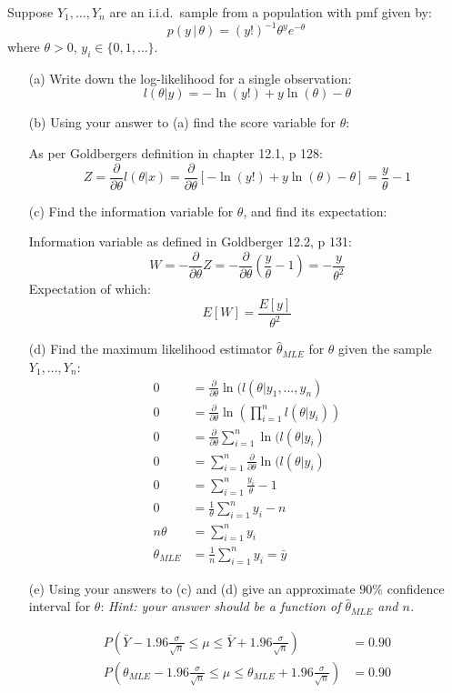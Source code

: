 \documentclass{article}
\newcommand{\1}{\mathbf{1}}
\begin{document}
Suppose $Y_1,\ldots, Y_n$ are an i.i.d.~sample from a population with pmf given by:
\begin{equation}
    p(y\, |\, \theta) = (y!)^{-1} \theta^y e^{-\theta} 
\end{equation}
where {$\theta > 0$}, $y_i \in \{0,1,\ldots \}$.
\begin{itemize}
    \item[(a)] Write down the log-likelihood for a single observation:
    $$l(\theta|y) = -\ln(y!) + y\ln(\theta) - \theta$$

    \item[(b)] Using your answer to (a) find the score variable for $\theta$:
    
    As per Goldbergers definition in chapter 12.1, p 128:
    $$ Z = \frac{\partial}{\partial\theta} l(\theta|x) = \frac{\partial}{\partial\theta}\left[  -\ln(y!) + y\ln(\theta) - \theta  \right] = \frac{y}{\theta} -1$$

    \item[(c)] Find the information variable for $\theta$, and find its expectation:
    
    Information variable as defined in Goldberger 12.2, p 131:
    $$W = -\frac{\partial}{\partial\theta} Z = -\frac{\partial}{\partial\theta } \left(\frac{y}{\theta} -1\right) = - \frac{y}{\theta^2}$$
    Expectation of which:
    $$E[W] = \frac{E[y]}{\theta^2}$$

    \item[(d)]  Find the maximum likelihood estimator $\hat{\theta}_{MLE}$ for $\theta$ given the sample $Y_1,\ldots, Y_n$:
    \begin{align*}
        0 &= \frac{\partial}{\partial\theta} \ln(l(\theta|y_1,\hdots ,y_n) \\
        0 &= \frac{\partial}{\partial\theta} \ln\left( \prod_{i=1}^n l(\theta|y_i) \right) \\
        0 &= \frac{\partial}{\partial\theta} \sum_{i=1}^n \ln(l(\theta|y_i) \\
        0 &= \sum_{i=1}^n \frac{\partial}{\partial\theta} \ln(l(\theta|y_i) \\
        0 &= \sum_{i=1}^n \frac{y_i}{\theta} -1 \\
        0 &= \frac{1}{\theta} \sum_{i=1}^n y_i - n \\
        n\theta  &= \sum_{i=1}^n y_i \\
        \theta_{MLE} &= \frac{1}{n} \sum_{i=1}^n y_i = \bar y 
    \end{align*}

    \item[(e)]  Using your answers to (c) and (d) give an approximate $90\%$ confidence interval for $\theta$: {\it Hint: your answer should be a function of $\hat{\theta}_{MLE}$ and $n$.}
    
    \begin{align*}
        P\left(\bar Y - 1.96\frac{\sigma}{\sqrt n} \leq \mu \leq \bar Y + 1.96\frac{\sigma}{\sqrt n}\right) &= 0.90 \\
        P\left(\theta_{MLE}- 1.96\frac{\sigma}{\sqrt n} \leq \mu \leq \theta_{MLE} + 1.96\frac{\sigma}{\sqrt n}\right) &= 0.90
    \end{align*} 
\end{itemize}
\end{document}
